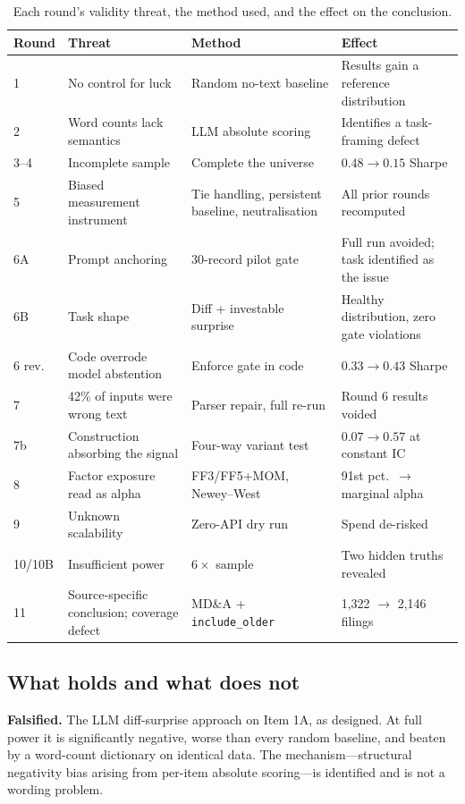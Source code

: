 \documentclass[11pt]{article}
\newcommand{\sig}[1]{\texttt{#1}}
\begin{document}
\begin{table}[H]
\centering\small
\caption{Each round's validity threat, the method used, and the effect on the conclusion.}
\setlength{\tabcolsep}{4pt}\footnotesize
\begin{tabular}{l p{4.3cm} p{3.6cm} p{3.9cm}}
\toprule
\textbf{Round} & \textbf{Threat} & \textbf{Method} & \textbf{Effect} \\
\midrule
1  & No control for luck & Random no-text baseline & Results gain a reference distribution \\
2  & Word counts lack semantics & LLM absolute scoring & Identifies a task-framing defect \\
3--4 & Incomplete sample & Complete the universe & $0.48 \rightarrow 0.15$ Sharpe \\
5  & Biased measurement instrument & Tie handling, persistent baseline, neutralisation & All prior rounds recomputed \\
6A & Prompt anchoring & 30-record pilot gate & Full run avoided; task identified as the issue \\
6B & Task shape & Diff + investable surprise & Healthy distribution, zero gate violations \\
6 rev.\ & Code overrode model abstention & Enforce gate in code & $0.33 \rightarrow 0.43$ Sharpe \\
7  & 42\% of inputs were wrong text & Parser repair, full re-run & Round 6 results voided \\
7b & Construction absorbing the signal & Four-way variant test & $0.07 \rightarrow 0.57$ at constant IC \\
8  & Factor exposure read as alpha & FF3/FF5+MOM, Newey--West & 91st pct.\ $\rightarrow$ marginal alpha \\
9  & Unknown scalability & Zero-API dry run & Spend de-risked \\
10/10B & Insufficient power & $6\times$ sample & Two hidden truths revealed \\
11 & Source-specific conclusion; coverage defect & MD\&A + \sig{include\_older} & 1,322 $\rightarrow$ 2,146 filings \\
\bottomrule
\end{tabular}
\end{table}

\subsection{What holds and what does not}

\textbf{Falsified.} The LLM diff-surprise approach on Item 1A, as designed. At full power
it is significantly negative, worse than every random baseline, and beaten by a word-count
dictionary on identical data. The mechanism---structural negativity bias arising from
per-item absolute scoring---is identified and is not a wording problem.
\end{document}
